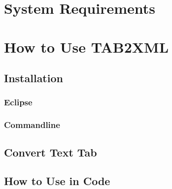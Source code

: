 \documentclass[11pt]{article}
\date{\today}
\title{}
\begin{document}
\tableofcontents

\newpage
\section{System Requirements}
\label{sec:orgb5f10ee}
\section{How to Use TAB2XML}
\label{sec:orga3716ba}
\subsection{Installation}
\label{sec:org7cc3038}
\subsubsection{Eclipse}
\label{sec:org75b112d}
\subsubsection{Commandline}
\label{sec:org5706845}
\subsection{Convert Text Tab}
\label{sec:org72372d7}
\subsection{How to Use in Code}
\label{sec:org7bd79d0}
\end{document}
